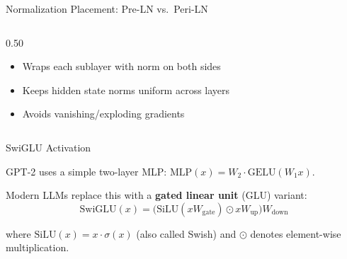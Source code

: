 \begin{frame}{Normalization Placement: Pre-LN vs.\ Peri-LN~\cite{he2025periln}}
\begin{columns}[T]
\begin{column}{0.50\textwidth}
      \vspace{-0.3em}
      {\footnotesize
      \begin{itemize}
        \item Wraps each sublayer with norm on both sides
        \item Keeps hidden state norms uniform across layers
        \item Avoids vanishing/exploding gradients
      \end{itemize}}
    \end{column}
  \end{columns}
\end{frame}

\begin{frame}{SwiGLU Activation~\cite{shazeer2020glu}}

  GPT-2 uses a simple two-layer MLP: $\text{MLP}(x) = W_2 \cdot \text{GELU}(W_1 x)$.

  \vspace{0.3em}
  Modern LLMs replace this with a \textbf{gated linear unit} (GLU) variant:
  \[
    \text{SwiGLU}(x) = \bigl(\text{SiLU}(x W_{\text{gate}}) \odot x W_{\text{up}}\bigr) W_{\text{down}}
  \]

  where $\text{SiLU}(x) = x \cdot \sigma(x)$ (also called Swish) and $\odot$ denotes element-wise multiplication.


\end{frame}
